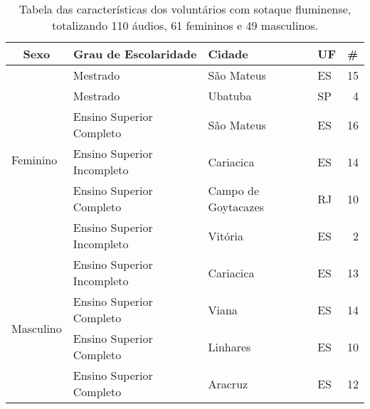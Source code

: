 \begin{table}[h]
\caption{Tabela das características dos voluntários com sotaque fluminense, totalizando 110 áudios, 61 femininos e 49 masculinos.} \label{Tabela_fluminense}
\begin{tabular}{|l|l|l|l|r|}
\hline
\multicolumn{1}{|c|}{Sexo} & \multicolumn{1}{c|}{Grau de Escolaridade} & Cidade              & UF & \multicolumn{1}{l|}{\#} \\ \hline
\multirow{6}{*}{Feminino}  & Mestrado                                  & São Mateus          & ES & 15                      \\ \cline{2-5} 
                           & Mestrado                                  & Ubatuba             & SP & 4                       \\ \cline{2-5} 
                           & Ensino Superior Completo                  & São Mateus          & ES & 16                      \\ \cline{2-5} 
                           & Ensino Superior Incompleto                & Cariacica           & ES & 14                      \\ \cline{2-5} 
                           & Ensino Superior Completo                  & Campo de Goytacazes & RJ & 10                      \\ \cline{2-5} 
                           & Ensino Superior Incompleto                & Vitória             & ES & 2                       \\ \hline
\multirow{4}{*}{Masculino} & Ensino Superior Incompleto                & Cariacica           & ES & 13                      \\ \cline{2-5} 
                           & Ensino Superior Completo                  & Viana               & ES & 14                      \\ \cline{2-5} 
                           & Ensino Superior Completo                  & Linhares            & ES & 10                      \\ \cline{2-5} 
                           & Ensino Superior Completo                  & Aracruz             & ES & 12                      \\ \hline
\end{tabular}
\end{table}

